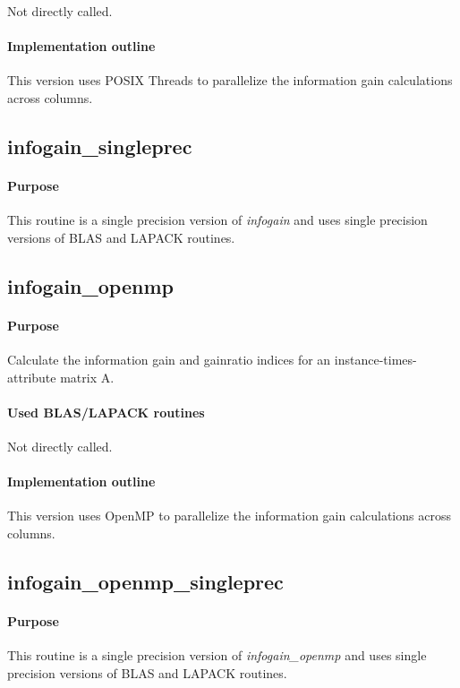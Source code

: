 \documentclass[a4paper,10pt]{scrartcl}
\begin{document}
			Not directly called.

			\paragraph{Implementation outline}

			This version uses POSIX Threads to parallelize the information gain calculations across columns.

		\subsection{infogain\_singleprec}

			\paragraph{Purpose}

			This routine is a single precision version of \emph{infogain} and uses single precision versions
			of BLAS and LAPACK routines.	

		\subsection{infogain\_openmp}

			\paragraph{Purpose}

			Calculate the information gain and gainratio indices for an instance-times-attribute matrix A.

			\paragraph{Used BLAS/LAPACK routines}

			Not directly called.

			\paragraph{Implementation outline}

			This version uses OpenMP to parallelize the information gain calculations across columns.

		\subsection{infogain\_openmp\_singleprec}

			\paragraph{Purpose}

			This routine is a single precision version of \emph{infogain\_openmp} and uses single precision versions
			of BLAS and LAPACK routines.	





		
\end{document}
